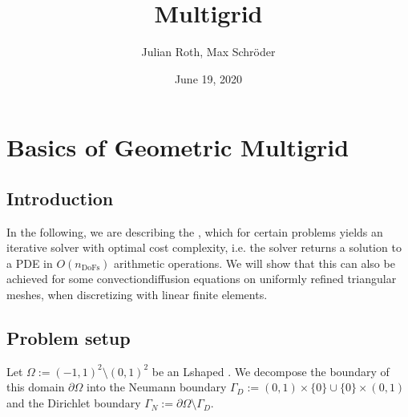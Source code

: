 \documentclass[letterpaper,10pt,english, openany]{sphinxmanual}
\title{Multigrid}
\date{June 19, 2020}
\author{Julian Roth, Max Schröder}
\begin{document}
\pagestyle{empty}
\sphinxmaketitle
\pagestyle{plain}
\sphinxtableofcontents
\pagestyle{normal}


\chapter{Basics of Geometric Multigrid}
\label{\detokenize{basics:basics-of-geometric-multigrid}}\label{\detokenize{basics::doc}}



\section{Introduction}
\label{\detokenize{basics:introduction}}
In the following, we are describing the {\color{blue}{geometric multigrid method}},
which for certain problems yields an iterative solver
with optimal cost complexity, i.e. the solver returns a solution to a PDE in
\(O(n_{\text{DoFs}})\) arithmetic operations. We will show that this can also
be achieved for some convection\sphinxhyphen{}diffusion equations on uniformly refined triangular
meshes, when discretizing with linear finite elements.


\section{Problem setup}
\label{\detokenize{basics:problem-setup}}
Let \(\Omega := (-1,1)^2 \setminus (0,1)^2\) be an L\sphinxhyphen{}shaped {\color{blue}{domain}}. We decompose the boundary of this domain \(\partial\Omega\) into the Neumann boundary \(\Gamma_D := (0,1) \times \{0\} \cup \{0\} \times (0,1)\)
and the Dirichlet boundary \(\Gamma_N := \partial\Omega \setminus \Gamma_D\).
\end{document}
